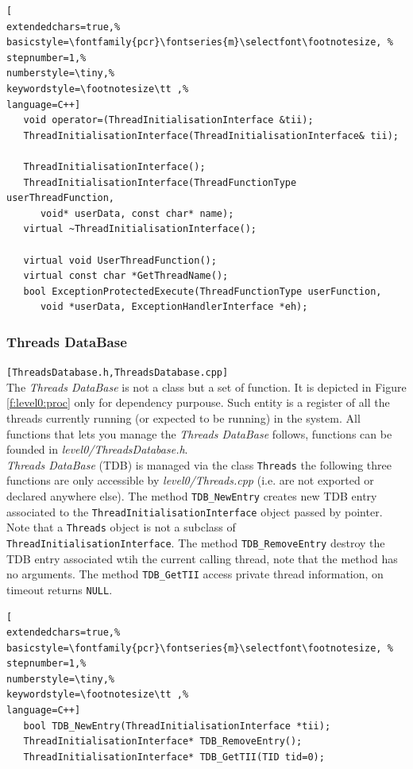 \begin{lstlisting}[
extendedchars=true,%
basicstyle=\fontfamily{pcr}\fontseries{m}\selectfont\footnotesize, %
stepnumber=1,%
numberstyle=\tiny,%
keywordstyle=\footnotesize\tt ,%
language=C++]
   void operator=(ThreadInitialisationInterface &tii);
   ThreadInitialisationInterface(ThreadInitialisationInterface& tii);

   ThreadInitialisationInterface();
   ThreadInitialisationInterface(ThreadFunctionType userThreadFunction,
      void* userData, const char* name);
   virtual ~ThreadInitialisationInterface();

   virtual void UserThreadFunction();
   virtual const char *GetThreadName();
   bool ExceptionProtectedExecute(ThreadFunctionType userFunction,
      void *userData, ExceptionHandlerInterface *eh);
\end{lstlisting}



\subsubsection{Threads DataBase}
\texttt{[ThreadsDatabase.h,ThreadsDatabase.cpp]}\\
The \textit{Threads DataBase} is not a class but a set of function. It is depicted in Figure \ref{f:level0:proc} only for dependency purpouse. Such entity is a register of all the threads currently running (or expected to be running) in the system. All functions that lets you manage the \textit{Threads DataBase} follows, functions can be founded in \textit{level0/ThreadsDatabase.h}.\\


\textit{Threads DataBase} (TDB) is managed via the class \texttt{Threads} the following three functions are only accessible by \textit{level0/Threads.cpp} (i.e. are not exported or declared anywhere else).
The method \texttt{TDB\_NewEntry} creates new TDB entry associated to the \texttt{ThreadInitialisationInterface} object passed by pointer. Note that a \texttt{Threads} object is not a subclass of \texttt{ThreadInitialisationInterface}. The method \texttt{TDB\_RemoveEntry} destroy the TDB entry associated wtih the current calling thread, note that the method has no arguments. The method \texttt{TDB\_GetTII} access private thread information, on timeout returns \texttt{NULL}.

\begin{lstlisting}[
extendedchars=true,%
basicstyle=\fontfamily{pcr}\fontseries{m}\selectfont\footnotesize, %
stepnumber=1,%
numberstyle=\tiny,%
keywordstyle=\footnotesize\tt ,%
language=C++]
   bool TDB_NewEntry(ThreadInitialisationInterface *tii);
   ThreadInitialisationInterface* TDB_RemoveEntry();
   ThreadInitialisationInterface* TDB_GetTII(TID tid=0);
\end{lstlisting}

